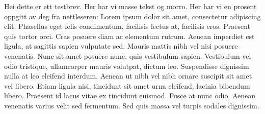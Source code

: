 

    \begin{letter}{\brevparameter}
        Hei dette er ett testbrev. Her har vi masse tekst og morro.
        Her har vi en prosent oppgitt av deg fra nettleseren: \feltoppgittprosent
        Lorem ipsum dolor sit amet, consectetur adipiscing elit. Phasellus eget felis condimentum, facilisis lectus at, facilisis eros. Praesent quis tortor orci. Cras posuere diam ac elementum rutrum. Aenean imperdiet est ligula, at sagittis sapien vulputate sed. Mauris mattis nibh vel nisi posuere venenatis. Nunc sit amet posuere nunc, quis vestibulum sapien. Vestibulum vel odio tristique, ullamcorper mauris volutpat, dictum leo. Suspendisse dignissim nulla at leo eleifend interdum. Aenean ut nibh vel nibh ornare suscipit sit amet vel libero. Etiam ligula nisi, tincidunt sit amet urna eleifend, lacinia bibendum libero. Praesent id lacus vitae ex tincidunt euismod. Fusce at nunc odio. Aenean venenatis varius velit sed fermentum. Sed quis massa vel turpis sodales dignissim.

        \frasedinerettigheter
        \frasenyfrase


    \end{letter}
